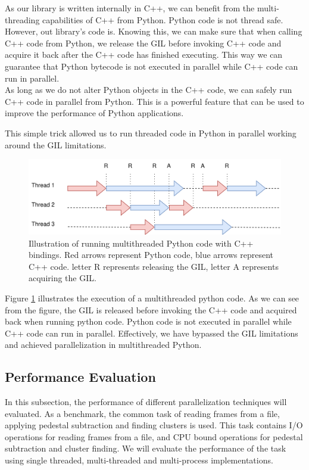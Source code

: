 \begin{spacing}{1.2}
    As our library is written internally in C++, we can benefit from the multi-threading capabilities
    of C++ from Python. Python code is not thread safe. However, out library's code is.
    Knowing this, we can make sure that when calling C++ code from Python, we release the GIL before
    invoking C++ code and acquire it back after the C++ code has finished executing. This way we can
    guarantee that Python bytecode is not executed in parallel while C++ code can run in parallel.\\

    As long as we do not alter Python objects in the C++ code, we can safely run C++ code in parallel
    from Python. This is a powerful feature that can be used to improve the performance of Python applications.

    This simple trick allowed us to run threaded code in Python in parallel working around the
    GIL limitations.

    \begin{figure}
        \centering
        \includegraphics[width=\textwidth]{Chapitre4/figures/gil_c.png}
        \caption{Illustration of running multithreaded Python code with C++ bindings. Red arrows
            represent Python code, blue arrows represent C++ code. letter R represents releasing the GIL,
            letter A represents acquiring the GIL.}
        \label{fig:python_parallelization}
    \end{figure}

    Figure \ref{fig:python_parallelization} illustrates the execution of a multithreaded python code.
    As we can see from the figure, the GIL is released before invoking the C++ code and acquired back
    when running python code. Python code is not executed in parallel while C++ code can run in parallel.
    Effectively, we have bypassed the GIL limitations and achieved parallelization in multithreaded Python.

    \subsection{Performance Evaluation}
    In this subsection, the performance of different parallelization techniques will evaluated.
    As a benchmark, the common task of reading frames from a file, applying pedestal
    subtraction and finding clusters is used. This task contains I/O operations for reading frames from a file,
    and CPU bound operations for pedestal subtraction and cluster finding. We will evaluate the performance
    of the task using single threaded, multi-threaded and multi-process implementations.\\


\end{spacing}
